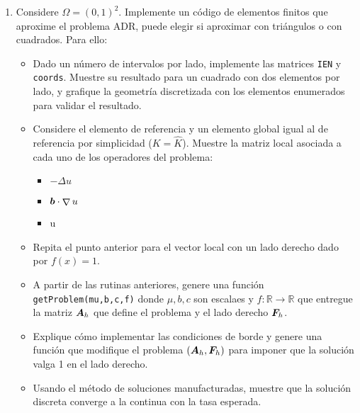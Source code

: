 \documentclass{article}
\renewcommand{\vec}{\vectorsym}
\newcommand{\mat}{\matrixsym}
\DeclareMathOperator{\grad}{\nabla}
\newcommand{\R}{\mathbb{R}}
\newcommand{\pts}[1]{[{\bf #1 puntos}] }
\begin{document}
\begin{enumerate}
    \item Considere $\Omega = (0,1)^2$. Implemente un código de elementos finitos que aproxime el problema ADR, puede elegir si aproximar con triángulos o con cuadrados. Para ello: 
            \begin{itemize}
                \item\pts{1} Dado un número de intervalos por lado, implemente las matrices \texttt{IEN} y \texttt{coords}. Muestre su resultado para un cuadrado con dos elementos por lado, y grafique la geometría discretizada con los elementos enumerados para validar el resultado.
                \item\pts{3} Considere el elemento de referencia y un elemento global igual al de referencia por simplicidad ($K = \hat K$). Muestre la matriz local asociada a cada uno de los operadores del problema: 
                    \begin{itemize}
                        \item $-\Delta u$
                        \item $\vec b \cdot \grad u$
                        \item u
                    \end{itemize}
                \item\pts{2} Repita el punto anterior para el vector local con un lado derecho dado por $f(x) = 1$. 
                \item\pts{3} A partir de las rutinas anteriores, genere una función \texttt{getProblem(mu,b,c,f)} donde $\mu,b,c$ son escalaes y $f:\R\to\R$ que entregue la matriz $\mat A_h$ que define el problema y el lado derecho $\vec F_h$.
                \item\pts{2} Explique cómo implementar las condiciones de borde y genere una función que modifique el problema $(\mat A_h, \vec F_h)$ para imponer que la solución valga 1 en el lado derecho. 
                \item\pts{3} Usando el método de soluciones manufacturadas, muestre que la solución discreta converge a la continua con la tasa esperada. 
            \end{itemize}
\end{enumerate}

\end{document}
